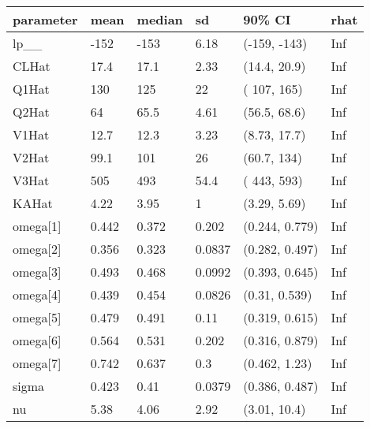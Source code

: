 
\begin{tabular}{l|l|l|l|l|l}
\hline
parameter & mean & median & sd & 90\% CI & rhat\\
\hline
lp\_\_ & -152 & -153 & 6.18 & (-159, -143) & Inf\\
\hline
CLHat & 17.4 & 17.1 & 2.33 & (14.4, 20.9) & Inf\\
\hline
Q1Hat & 130 & 125 & 22 & ( 107,  165) & Inf\\
\hline
Q2Hat & 64 & 65.5 & 4.61 & (56.5, 68.6) & Inf\\
\hline
V1Hat & 12.7 & 12.3 & 3.23 & (8.73, 17.7) & Inf\\
\hline
V2Hat & 99.1 & 101 & 26 & (60.7,  134) & Inf\\
\hline
V3Hat & 505 & 493 & 54.4 & ( 443,  593) & Inf\\
\hline
KAHat & 4.22 & 3.95 & 1 & (3.29, 5.69) & Inf\\
\hline
omega[1] & 0.442 & 0.372 & 0.202 & (0.244, 0.779) & Inf\\
\hline
omega[2] & 0.356 & 0.323 & 0.0837 & (0.282, 0.497) & Inf\\
\hline
omega[3] & 0.493 & 0.468 & 0.0992 & (0.393, 0.645) & Inf\\
\hline
omega[4] & 0.439 & 0.454 & 0.0826 & (0.31, 0.539) & Inf\\
\hline
omega[5] & 0.479 & 0.491 & 0.11 & (0.319, 0.615) & Inf\\
\hline
omega[6] & 0.564 & 0.531 & 0.202 & (0.316, 0.879) & Inf\\
\hline
omega[7] & 0.742 & 0.637 & 0.3 & (0.462, 1.23) & Inf\\
\hline
sigma & 0.423 & 0.41 & 0.0379 & (0.386, 0.487) & Inf\\
\hline
nu & 5.38 & 4.06 & 2.92 & (3.01, 10.4) & Inf\\
\hline
\end{tabular}
